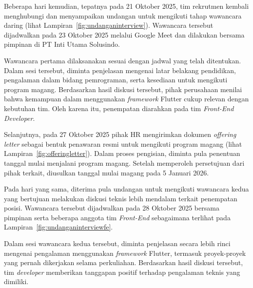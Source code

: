 Beberapa hari kemudian, tepatnya pada 21 Oktober 2025, tim rekrutmen kembali
menghubungi dan menyampaikan undangan untuk mengikuti tahap wawancara daring
(lihat Lampiran~\ref{fig:undanganinterview}). Wawancara tersebut dijadwalkan
pada 23 Oktober 2025 melalui Google Meet dan dilakukan bersama pimpinan di PT
Inti Utama Solusindo.

Wawancara pertama dilaksanakan sesuai dengan jadwal yang telah ditentukan.
Dalam sesi tersebut, diminta penjelasan mengenai latar belakang pendidikan,
pengalaman dalam bidang pemrograman, serta kesediaan untuk mengikuti program
magang. Berdasarkan hasil diskusi tersebut, pihak perusahaan menilai bahwa
kemampuan dalam menggunakan \textit{framework} Flutter cukup relevan dengan
kebutuhan tim. Oleh karena itu, penempatan diarahkan pada tim \textit{Front-End
    Developer}.

Selanjutnya, pada 27 Oktober 2025 pihak HR mengirimkan dokumen \textit{offering
    letter} sebagai bentuk penawaran resmi untuk mengikuti program magang (lihat
Lampiran~\ref{fig:offeringletter}). Dalam proses pengisian, diminta pula
penentuan tanggal mulai menjalani program magang. Setelah memperoleh
persetujuan dari pihak terkait, diusulkan tanggal mulai magang pada 5 Januari
2026.

Pada hari yang sama, diterima pula undangan untuk mengikuti wawancara kedua
yang bertujuan melakukan diskusi teknis lebih mendalam terkait penempatan
posisi. Wawancara tersebut dijadwalkan pada 28 Oktober 2025 bersama pimpinan
serta beberapa anggota tim \textit{Front-End} sebagaimana terlihat pada
Lampiran~\ref{fig:undanganinterviewfe}.

Dalam sesi wawancara kedua tersebut, diminta penjelasan secara lebih rinci
mengenai pengalaman menggunakan \textit{framework} Flutter, termasuk
proyek-proyek yang pernah dikerjakan selama perkuliahan. Berdasarkan hasil
diskusi tersebut, tim \textit{developer} memberikan tanggapan positif terhadap
pengalaman teknis yang dimiliki.



